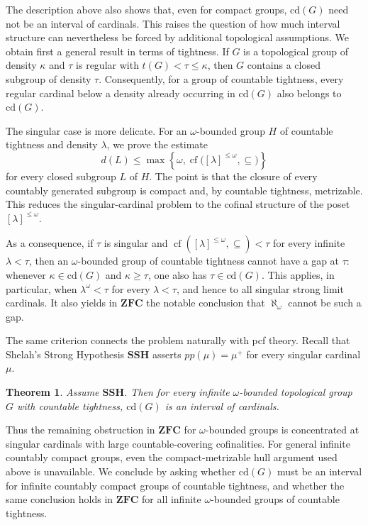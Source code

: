 \documentclass[12pt]{amsart}
\newtheorem{thmA}{Theorem}
\theoremstyle{definition}
\numberwithin{equation}{section}
\theoremstyle{remark}
\def\cd{\mathrm{cd}}
\begin{document}
The description above also shows that, even for compact groups, $\cd(G)$
need not be an interval of cardinals. This raises the question of how much
interval structure can nevertheless be forced by additional topological
assumptions. We obtain first a general result in terms of tightness. If
$G$ is a topological group of density $\kappa$ and $\tau$ is regular with
$t(G)<\tau\leq\kappa$, then $G$ contains a closed subgroup of density
$\tau$. Consequently, for a group of countable tightness, every regular
cardinal below a density already occurring in $\cd(G)$ also belongs to
$\cd(G)$.

The singular case is more delicate. For an $\omega$-bounded group $H$ of
countable tightness and density $\lambda$, we prove the estimate
\[
d(L)\leq
\max\left\{\omega,
\operatorname{cf}\bigl([\lambda]^{\leq\omega},\subseteq\bigr)\right\}
\]
for every closed subgroup $L$ of $H$. The point is that the closure of
every countably generated subgroup is compact and, by countable
tightness, metrizable. This reduces the singular-cardinal problem to the
cofinal structure of the poset $[\lambda]^{\leq\omega}$.

As a consequence, if $\tau$ is singular and
$\operatorname{cf}([\lambda]^{\leq\omega},\subseteq)<\tau$ for every
infinite $\lambda<\tau$, then an $\omega$-bounded group of countable
tightness cannot have a gap at $\tau$: whenever
$\kappa\in\cd(G)$ and $\kappa\geq\tau$, one also has
$\tau\in\cd(G)$. This applies, in particular, when
$\lambda^\omega<\tau$ for every $\lambda<\tau$, and hence to all
singular strong limit cardinals. It also yields in $\mathbf{ZFC}$ the
notable conclusion that $\aleph_\omega$ cannot be such a gap.

The same criterion connects the problem naturally with pcf theory.
Recall that Shelah's Strong Hypothesis $\mathbf{SSH}$ asserts
$pp(\mu)=\mu^+$ for every singular cardinal $\mu$. 

\begin{thmA}\label{ThC}
Assume $\mathbf{SSH}$. Then for every infinite $\omega$-bounded topological group
$G$ with countable tightness, $\cd(G)$ is an interval of cardinals.
\end{thmA}

Thus the remaining obstruction in $\mathbf{ZFC}$ for $\omega$-bounded
groups is concentrated at singular cardinals with large countable-covering
cofinalities. For general infinite countably compact groups, even the
compact-metrizable hull argument used above is unavailable. We conclude
by asking whether $\cd(G)$ must be an interval for infinite countably compact
groups of countable tightness, and whether the same conclusion holds in
$\mathbf{ZFC}$ for all infinite $\omega$-bounded groups of countable tightness.
\end{document}
